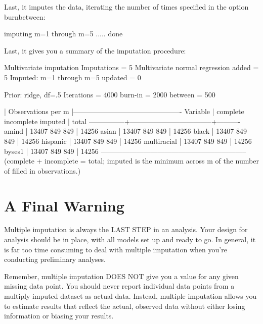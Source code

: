 \documentclass[12 pt]{article}
\begin{document}
Last, it imputes the data, iterating the number of times specified in
the option burnbetween:

\begin{stlog}
    imputing m=1 through m=5 ..... done
\end{stlog}

Last, it gives you a summary of the imputation procedure:

\begin{stlog}
  Multivariate imputation                 Imputations =        5
Multivariate normal regression                added =        5
Imputed: m=1 through m=5                    updated =        0

Prior: ridge, df=.5                      Iterations =     4000
                                            burn-in =     2000
                                            between =      500

               |              Observations per m              
               |----------------------------------------------
      Variable |   complete   incomplete   imputed |     total
---------------+-----------------------------------+----------
         amind |      13407          849       849 |     14256
         asian |      13407          849       849 |     14256
         black |      13407          849       849 |     14256
      hispanic |      13407          849       849 |     14256
   multiracial |      13407          849       849 |     14256
        byses1 |      13407          849       849 |     14256
--------------------------------------------------------------
(complete + incomplete = total; imputed is the minimum across m
 of the number of filled in observations.)

\end{stlog}

\section{A Final Warning}

Multiple imputation is always the LAST STEP in an analysis. Your
design for analysis should be in place, with all models set up and
ready to go. In general, it is far too time consuming to deal with
multiple imputation when you're conducting preliminary analyses. 

Remember, multiple imputation DOES NOT give you a value for any given
missing data point. You should never report individual data points
from a multiply imputed dataset as actual data. Instead, multiple
imputation allows you to estimate results that reflect the actual,
observed data without either losing information or biasing your
results. 
\end{document}
